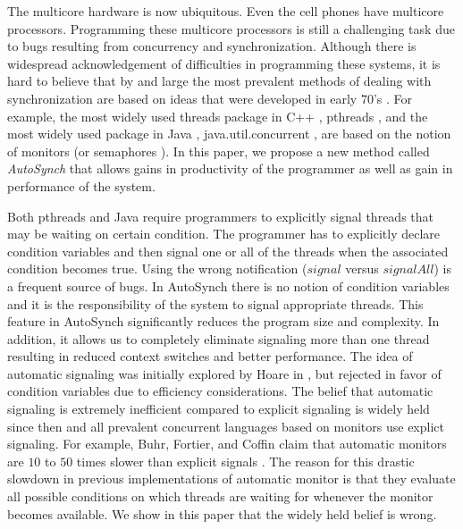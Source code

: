 \documentclass[preprint]{sigplanconf}
\begin{document}
The multicore hardware is now ubiquitous. Even the cell phones have
multicore processors. Programming these multicore processors is
still a challenging task due to
bugs resulting from concurrency and synchronization.
Although there is widespread acknowledgement of difficulties 
in programming these systems, it is hard to believe that by and large the most 
prevalent methods of dealing with synchronization are based on ideas that were 
developed in early 70's \cite{dijk68, hoa74, bh75a}. For 
example, the most widely used threads package in C++ \cite{stro97}, 
pthreads \cite{bute97}, and the most widely used package in Java \cite{gjs00}, 
java.util.concurrent \cite{lea05}, are based
on the notion of monitors \cite{hoa74, bh75a}(or semaphores \cite{dijk68}). 
In this paper, we propose a new method called {\em AutoSynch} 
that allows gains in productivity of the programmer as well as gain in
performance of the system.

Both pthreads and Java require programmers to explicitly
signal threads that may be waiting on certain condition. The programmer
has to explicitly declare condition variables and then signal one
or all of the threads when the associated condition becomes true.
Using the wrong notification ($signal$ versus $signalAll$) is a frequent
source of bugs. In AutoSynch there is no notion of condition variables
and it is the responsibility of the system to signal appropriate threads.
This feature in AutoSynch significantly reduces the program size and complexity.
In addition, it allows us to completely eliminate signaling more than 
one thread resulting in reduced context switches and better performance.
The idea of automatic signaling was initially explored by Hoare in \cite{hoa74},
but rejected in favor of condition variables due to efficiency considerations.
The belief that automatic signaling is extremely inefficient compared to
explicit signaling is widely held since then and
all prevalent concurrent languages based on monitors use
explict signaling.
For example, Buhr, Fortier, and Coffin claim that automatic monitors are $10$ to $50$ times
slower than explicit signals \cite{bfc95}. The reason for this drastic slowdown in 
previous implementations of automatic monitor  is that they evaluate
all possible conditions on which threads are waiting for whenever the monitor
becomes available. We show in this
paper that the widely held belief is wrong.
\end{document}
